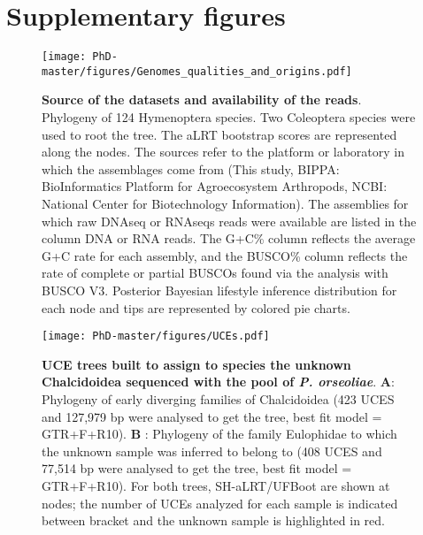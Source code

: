 

\section{Supplementary figures}

\begin{figure}[H]
 \centering
  \texttt{[image: PhD-master/figures/Genomes\_qualities\_and\_origins.pdf]}
\caption[Paper1:Genomic dataset sources]{\textbf{Source of the datasets and availability of the reads}. Phylogeny of 124 Hymenoptera species. Two Coleoptera species were used to root the tree. The aLRT bootstrap scores are represented along the nodes. The sources refer to the platform or laboratory in which the assemblages come from (This study, BIPPA: BioInformatics Platform for Agroecosystem Arthropods, NCBI: National Center for Biotechnology Information). The assemblies for which raw DNAseq or RNAseqs reads were available are listed in the column DNA or RNA reads. The G+C\% column reflects the average G+C rate for each assembly, and the BUSCO\% column reflects the rate of complete or partial BUSCOs found via the analysis with BUSCO V3. Posterior Bayesian lifestyle inference distribution for each node and tips  are represented by colored pie charts. }
\label{figure:Genomes_qualities_and_origins}
\end{figure}

\begin{figure}[H]
 \centering
  \texttt{[image: PhD-master/figures/UCEs.pdf]}
\caption[Paper1:UCE phylogenies to describe the unknown scaffolds]{\textbf{UCE trees built to assign to species the unknown Chalcidoidea sequenced with the pool of \textit{P. orseoliae}}. \textbf{A}: Phylogeny of early diverging families of Chalcidoidea (423 UCES and 127,979 bp were analysed to get the tree, best fit model = GTR+F+R10). \textbf{B} : Phylogeny of the family Eulophidae to which the unknown sample was inferred to belong to (408 UCES and 77,514 bp were analysed to get the tree, best fit model = GTR+F+R10). For both trees, SH-aLRT/UFBoot are shown at nodes; the number of UCEs analyzed for each sample is indicated between bracket and the unknown sample is highlighted in red.}
\label{figure:UCEs}
\end{figure}


